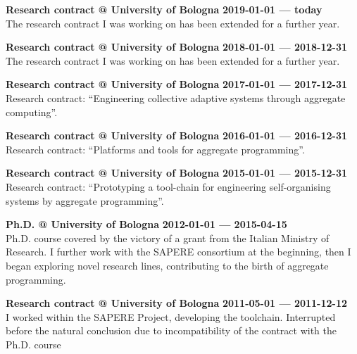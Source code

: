 \textbf{Research contract @ University of Bologna} \hfill \textbf{2019-01-01 --- today}\\
The research contract I was working on has been extended for a further year.

\halfblankline{}

\textbf{Research contract @ University of Bologna} \hfill \textbf{2018-01-01 --- 2018-12-31}\\
The research contract I was working on has been extended for a further year.

\halfblankline{}

\textbf{Research contract @ University of Bologna} \hfill \textbf{2017-01-01 --- 2017-12-31}\\
Research contract: ``Engineering collective adaptive systems through aggregate computing''.

\halfblankline{}

\textbf{Research contract @ University of Bologna} \hfill \textbf{2016-01-01 --- 2016-12-31}\\
Research contract: ``Platforms and tools for aggregate programming''.

\halfblankline{}

\textbf{Research contract @ University of Bologna} \hfill \textbf{2015-01-01 --- 2015-12-31}\\
Research contract: ``Prototyping a tool-chain for engineering self-organising systems by aggregate programming''.

\halfblankline{}

\textbf{Ph.D. @ University of Bologna} \hfill \textbf{2012-01-01 --- 2015-04-15}\\
Ph.D. course covered by the victory of a grant from the Italian Ministry of Research.
I further work with the SAPERE consortium at the beginning, then I began exploring novel research lines, contributing to the birth of aggregate programming.

\halfblankline{}

\textbf{Research contract @ University of Bologna} \hfill \textbf{2011-05-01 --- 2011-12-12}\\
I worked within the SAPERE Project, developing the toolchain.
Interrupted before the natural conclusion due to incompatibility of the contract with the Ph.D. course
